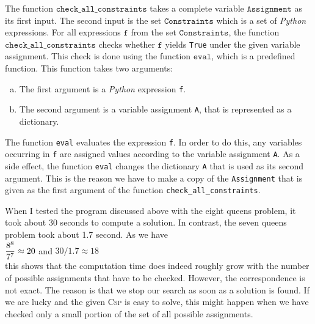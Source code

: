 The function $\texttt{check\_all\_constraints}$ takes a complete variable $\texttt{Assignment}$ as
its first input.  The second input is the set $\texttt{Constraints}$ which is a set of \textsl{Python}
expressions.  For all expressions
$\texttt{f}$ from the set $\texttt{Constraints}$, the function $\texttt{check\_all\_constraints}$ checks
whether $\texttt{f}$ yields \texttt{True} under the given variable assignment.
This check is done using the function $\texttt{eval}$, which is a predefined function.  
This function takes two arguments: 
\begin{enumerate}[(a)]
\item The first argument is a \textsl{Python} expression \texttt{f}.
\item The second argument is a variable assignment \texttt{A}, that is represented as a dictionary.
\end{enumerate}
The function \texttt{eval} evaluates the expression \texttt{f}.  In order to do this, any variables occurring
in \texttt{f} are assigned values according to the variable assignment \texttt{A}.  As a side effect, the function
\texttt{eval} changes the dictionary \texttt{A} that is used as its second argument.  This is the reason we have
to make a copy of the \texttt{Assignment} that is given as the first argument of the function
\texttt{check\_all\_constraints}. 

When I tested the program discussed above with the eight queens problem, it took about 30 seconds to
compute a solution.  In contrast, the seven queens problem took about 1.7 second.  As we have
\\[0.2cm]
\hspace*{1.3cm}
$\displaystyle\frac{8^8}{7^7} \approx 20$ \quad and \quad $30 / 1.7 \approx 18$ 
\\[0.2cm]
this shows that the computation time does indeed roughly grow with the number of possible assignments that
have to be checked.  However, the correspondence is not exact.  The reason is that we stop our
search as soon as a solution is found.  If we are lucky and the given \textsc{Csp} is easy to solve, this
might happen when we have checked only a small portion of the set of all possible assignments.

